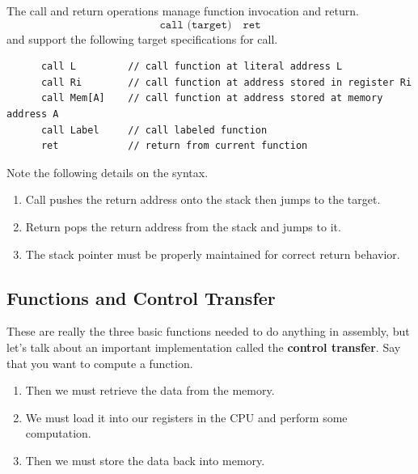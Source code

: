   \begin{definition}
    
  \end{definition}

  \begin{definition}
    The call and return operations manage function invocation and return.
    \begin{equation}
      \texttt{call (target)} \quad \texttt{ret}
    \end{equation}
    and support the following target specifications for call.
    \begin{lstlisting}
      call L         // call function at literal address L
      call Ri        // call function at address stored in register Ri
      call Mem[A]    // call function at address stored at memory address A
      call Label     // call labeled function
      ret            // return from current function
    \end{lstlisting}
    Note the following details on the syntax.
    \begin{enumerate}
      \item Call pushes the return address onto the stack then jumps to the target.
      \item Return pops the return address from the stack and jumps to it.
      \item The stack pointer must be properly maintained for correct return behavior.
    \end{enumerate}
  \end{definition}

\subsection{Functions and Control Transfer}

  These are really the three basic functions needed to do anything in assembly, but let's talk about an important implementation called the \textbf{control transfer}. Say that you want to compute a function. 
  \begin{enumerate}
    \item Then we must retrieve the data from the memory. 
    \item We must load it into our registers in the CPU and perform some computation. 
    \item Then we must store the data back into memory. 
  \end{enumerate}

